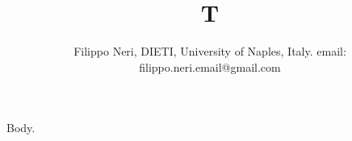 \documentclass{article}
\begin{document}
\title{T}
\author{Filippo Neri, DIETI, University of Naples, Italy. email: filippo.neri.email@gmail.com}
\maketitle
Body.
\end{document}
